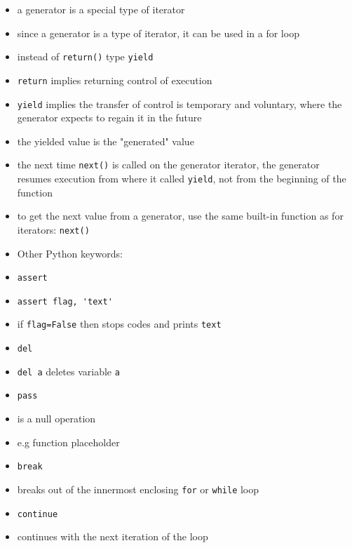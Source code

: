\documentclass[onecolumn]{IEEEtran} %
\begin{document}
\begin{itemize}
            \item a generator is a special type of iterator
            \item since a generator is a type of iterator, it can be used in a for loop
        \ei
        \item instead of \verb|return()| type \verb|yield|
        \bi
            \item \verb|return| implies returning control of execution
            \item \verb|yield| implies the transfer of control is temporary and voluntary, where the generator expects to regain it in the future
        \ei
        \item the yielded value is the "generated" value
        \item the next time \verb|next()| is called on the generator iterator, the generator resumes execution from where it called \verb|yield|, not from the beginning of the function
        \bi
            \item to get the next value from a generator, use the same built-in function as for iterators: \verb|next()|
        \ei
    \ei
    \item Other Python keywords:
    \bi
        \item \verb|assert|
        \bi
            \item \verb|assert flag, 'text'|
            \item if \verb|flag=False| then stops codes and prints \verb|text|
        \ei
        \item \verb|del|
        \bi
            \item \verb|del a| deletes variable \verb|a|
        \ei
        \item \verb|pass|
        \bi
            \item is a null operation
            \item e.g function placeholder
        \ei
        \item \verb|break|	
        \bi
            \item  breaks out of the innermost enclosing \verb|for| or \verb|while| loop
        \ei
        \item \verb|continue|
        \bi
            \item continues with the next iteration of the loop
        \ei
    \ei
\end{itemize}

\newpage
\end{document}
